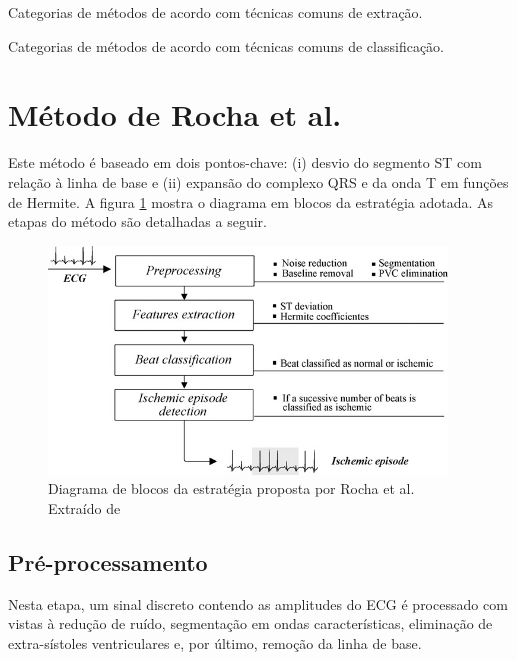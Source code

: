 \begin{table}[ht!]
    \centering
    
    \caption[Categorias de métodos de acordo com as técnicas de extração]{Categorias de métodos de acordo com técnicas comuns de extração.}
    \label{tab:extraction}
\end{table}

\begin{table}[ht!]
    \centering
    
    \caption[Categorias de métodos de acordo com as técnicas de classificação]{Categorias de métodos de acordo com técnicas comuns de classificação.}
    \label{tab:classification}
\end{table}


\section{Método de Rocha et al.}
\label{sec:rocha}
Este método é baseado em dois pontos-chave: (i) desvio do segmento ST com relação à linha de base e (ii) expansão do complexo QRS e da onda T em funções de Hermite. A figura \ref{fig:rochadiag} mostra o diagrama em blocos da estratégia adotada. As etapas do método são detalhadas a seguir.

\begin{figure}[ht]
    \centering
    \includegraphics[width=300pt]{figures/chap5-rocha-diagram.png}
    \caption[Diagrama de blocos da estratégia utilizada no método de Rocha et al.]{Diagrama de blocos da estratégia proposta por Rocha et al. Extraído de \cite{Rocha2010}}
    \label{fig:rochadiag}
\end{figure}

\subsection*{Pré-processamento}
Nesta etapa, um sinal discreto contendo as amplitudes do ECG é processado com vistas à redução de ruído, segmentação em ondas características, eliminação de extra-sístoles ventriculares e, por último, remoção da linha de base.


